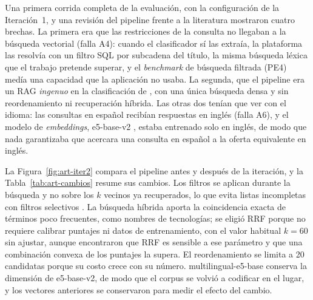 Una primera corrida completa de la evaluación, con la configuración de la Iteración~1, y una revisión del pipeline frente a la literatura mostraron cuatro brechas. La primera era que las restricciones de la consulta no llegaban a la búsqueda vectorial (falla A4): cuando el clasificador sí las extraía, la plataforma las resolvía con un filtro SQL por subcadena del título, la misma búsqueda léxica que el trabajo pretende superar, y el \textit{benchmark} de búsqueda filtrada (PE4) medía una capacidad que la aplicación no usaba. La segunda, que el pipeline era un RAG \emph{ingenuo} en la clasificación de \citet{Gao2023}, con una única búsqueda densa y sin reordenamiento ni recuperación híbrida. Las otras dos tenían que ver con el idioma: las consultas en español recibían respuestas en inglés (falla A6), y el modelo de \textit{embeddings}, e5-base-v2 \citep{Wang2022E5}, estaba entrenado solo en inglés, de modo que nada garantizaba que acercara una consulta en español a la oferta equivalente en inglés.

La Figura~\ref{fig:art-iter2} compara el pipeline antes y después de la iteración, y la Tabla~\ref{tab:art-cambios} resume sus cambios. Los filtros se aplican durante la búsqueda y no sobre los $k$ vecinos ya recuperados, lo que evita listas incompletas con filtros selectivos \citep{Gollapudi2023, Patel2024}. La búsqueda híbrida aporta la coincidencia exacta de términos poco frecuentes, como nombres de tecnologías; se eligió RRF porque no requiere calibrar puntajes ni datos de entrenamiento, con el valor habitual $k = 60$ sin ajustar, aunque \citet{Bruch2023} encontraron que RRF es sensible a ese parámetro y que una combinación convexa de los puntajes la supera. El reordenamiento se limita a 20 candidatas porque su costo crece con su número. multilingual-e5-base conserva la dimensión de e5-base-v2, de modo que el corpus se volvió a codificar en el lugar, y los vectores anteriores se conservaron para medir el efecto del cambio.


